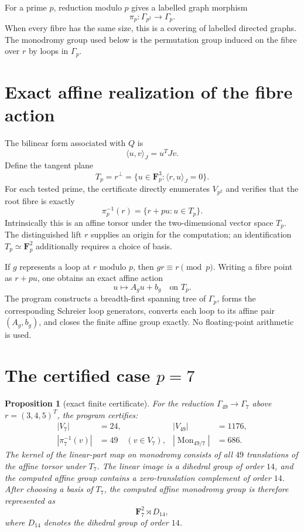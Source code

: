 \documentclass[11pt]{article}
\newtheorem{proposition}{Proposition}
\newcommand{\Fp}{\mathbf F_p}
\newcommand{\Fseven}{\mathbf F_7}
\begin{document}
For a prime $p$, reduction modulo $p$ gives a labelled graph morphism
\[
\pi_p:\Gamma_{p^2}\longrightarrow\Gamma_p.
\]
When every fibre has the same size, this is a covering of labelled directed graphs.  The monodromy group used below is the permutation group induced on the fibre over $r$ by loops in $\Gamma_p$.

\section{Exact affine realization of the fibre action}
The bilinear form associated with $Q$ is
\[
\langle u,v\rangle_J=u^T Jv.
\]
Define the tangent plane
\[
T_p=r^\perp=\{u\in\Fp^3:\langle r,u\rangle_J=0\}.
\]
For each tested prime, the certificate directly enumerates $V_{p^2}$ and verifies that the root fibre is exactly
\[
\pi_p^{-1}(r)=\{r+pu:u\in T_p\}.
\]
Intrinsically this is an affine torsor under the two-dimensional vector space $T_p$. The distinguished lift $r$ supplies an origin for the computation; an identification $T_p\simeq\Fp^2$ additionally requires a choice of basis.

If $g$ represents a loop at $r$ modulo $p$, then $g r\equiv r\pmod p$. Writing a fibre point as $r+pu$, one obtains an exact affine action
\[
u\longmapsto A_g u+b_g
\quad\text{on }T_p.
\]
The program constructs a breadth-first spanning tree of $\Gamma_p$, forms the corresponding Schreier loop generators, converts each loop to its affine pair $(A_g,b_g)$, and closes the finite affine group exactly.  No floating-point arithmetic is used.

\section{The certified case $p=7$}
\begin{proposition}[exact finite certificate]
For the reduction $\Gamma_{49}\to\Gamma_7$ above $r=(3,4,5)^T$, the program certifies:
\begin{align*}
|V_7|&=24, & |V_{49}|&=1176,\\
|\pi_7^{-1}(v)|&=49\quad(v\in V_7), & |\operatorname{Mon}_{49/7}|&=686.
\end{align*}
The kernel of the linear-part map on monodromy consists of all $49$ translations of the affine torsor under $T_7$.  The linear image is a dihedral group of order $14$, and the computed affine group contains a zero-translation complement of order $14$.  After choosing a basis of $T_7$, the computed affine monodromy group is therefore represented as
\[
\Fseven^2\rtimes D_{14},
\]
where $D_{14}$ denotes the dihedral group of order $14$.
\end{proposition}
\end{document}
